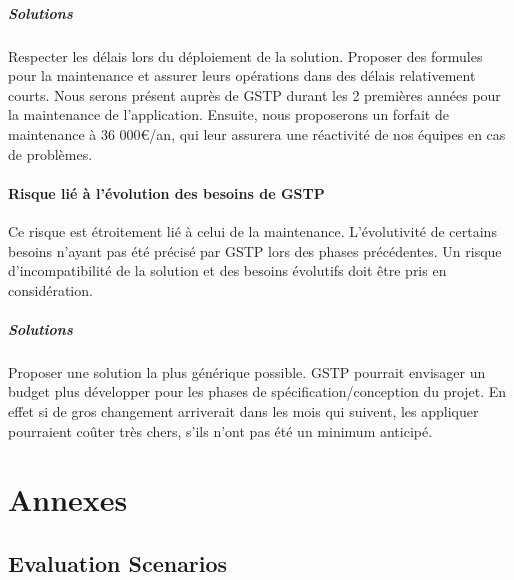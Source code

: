 \subparagraph{Solutions\\}
Respecter les délais lors du déploiement de la solution. Proposer des formules pour la maintenance et assurer leurs opérations dans des délais relativement courts. Nous serons présent auprès de GSTP durant les 2 premières années pour la maintenance de l'application. Ensuite, nous proposerons un forfait de maintenance à 36 000€/an, qui leur assurera une réactivité de nos équipes en cas de problèmes.

\paragraph{Risque lié à l'évolution des besoins de GSTP\\}
Ce risque est étroitement lié à celui de la maintenance. L'évolutivité de certains besoins n'ayant pas été précisé par GSTP lors des phases précédentes. Un risque d'incompatibilité de la solution et des besoins évolutifs doit être pris en considération.

\subparagraph{Solutions\\}
Proposer une solution la plus générique possible. GSTP pourrait envisager un budget plus développer pour les phases de spécification/conception du projet. En effet si de gros changement arriverait dans les mois qui suivent, les appliquer pourraient coûter très chers, s'ils n'ont pas été un minimum anticipé.

\section{Annexes}
    \subsection{Evaluation Scenarios}
        

